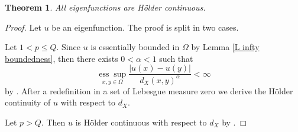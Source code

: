 \documentclass[a4paper,12pt,reqno]{amsart}
\numberwithin{equation}{section}
\theoremstyle{plain}
\newtheorem{theorem}{Theorem}[section]
\theoremstyle{definition}
\begin{document}
\begin{theorem}\label{Holder continuity}
All eigenfunctions  are H\"older continuous.
\end{theorem}
\begin{proof}
Let $u$ be an eigenfunction. The proof is split in two cases.

Let $1<p\leq Q$. Since $u$ is essentially bounded in $\Omega$ by Lemma \ref{L infty boundedness}, then there exists $0<\alpha<1$ such that
$$
\underset{x, y \in \Omega}{\operatorname{ess} \sup } \frac{|u(x)-u(y)|}{d_{X}(x,y)^\alpha} < \infty
$$
by \cite[Theorem 3.35]{capogna1993embedding}. After a redefinition in a set of Lebesgue measure zero we derive the H\"older continuity of $u$ with respect to  $d_{X}$.

Let $p>Q$. Then $u$ is H\"older continuous with respect to  $d_{X}$  by \cite[Remark 1.1]{chen2024sharp}.
\end{proof}
\end{document}
